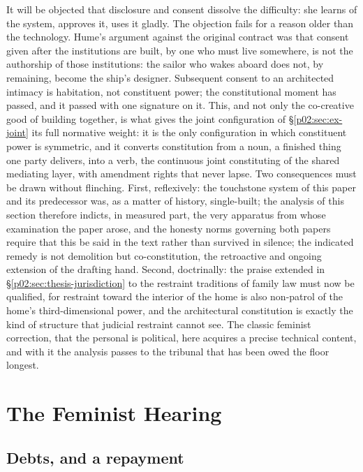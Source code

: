 It will be objected that disclosure and consent dissolve the difficulty: she learns of the system, approves it, uses it gladly. The objection fails for a reason older than the technology. Hume's argument against the original contract \parencite{hume1748original} was that consent given after the institutions are built, by one who must live somewhere, is not the authorship of those institutions: the sailor who wakes aboard does not, by remaining, become the ship's designer. Subsequent consent to an architected intimacy is habitation, not constituent power; the constitutional moment has passed, and it passed with one signature on it. This, and not only the co-creative good of building together, is what gives the joint configuration of \S\ref{p02:sec:ex-joint} its full normative weight: it is the only configuration in which constituent power is symmetric, and it converts constitution from a noun, a finished thing one party delivers, into a verb, the continuous joint constituting of the shared mediating layer, with amendment rights that never lapse. Two consequences must be drawn without flinching. First, reflexively: the touchstone system of this paper and its predecessor was, as a matter of history, single-built; the analysis of this section therefore indicts, in measured part, the very apparatus from whose examination the paper arose, and the honesty norms governing both papers require that this be said in the text rather than survived in silence; the indicated remedy is not demolition but co-constitution, the retroactive and ongoing extension of the drafting hand. Second, doctrinally: the praise extended in \S\ref{p02:sec:thesis-jurisdiction} to the restraint traditions of family law must now be qualified, for restraint toward the interior of the home is also non-patrol of the home's third-dimensional power, and the architectural constitution is exactly the kind of structure that judicial restraint cannot see. The classic feminist correction, that the personal is political, here acquires a precise technical content, and with it the analysis passes to the tribunal that has been owed the floor longest.

\section{The Feminist Hearing}
\label{p02:sec:feminism}

\subsection{Debts, and a repayment}
\label{p02:sec:fem-debts}

